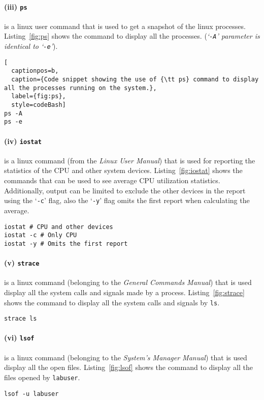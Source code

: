\documentclass[final,5p,times,authoryear]{elsarticle}
\begin{document}
% 
% 
\paragraph{(iii) {\tt ps}}is a linux user command that is used to get a snapshot of the linux processes. Listing~\ref{fig:ps} shows the command to display all the processes. ({\it `{\tt -A}' parameter is identical to `{\tt -e}'}).
\begin{lstlisting}[
  captionpos=b, 
  caption={Code snippet showing the use of {\tt ps} command to display all the processes running on the system.},
  label={fig:ps},
  style=codeBash]
ps -A
ps -e
\end{lstlisting}

% 
% 
\paragraph{(iv) {\tt iostat}}
is a linux command (from the {\it Linux User Manual}) that is used for reporting the statistics of the CPU and other system devices. Listing~\ref{fig:iostat} shows the commands that can be used to see average CPU utilization statistics. Additionally, output can be limited to exclude the other devices in the report using the `{\tt -c}' flag, also the `{\tt -y}' flag omits the first report when calculating the average.
\begin{lstlisting}[captionpos=b, caption={Code snippet showing the use of {\tt iostat} command.},label={fig:iostat},style=codeBash]
iostat # CPU and other devices
iostat -c # Only CPU
iostat -y # Omits the first report
\end{lstlisting}

% 
% 
\paragraph{(v) {\tt strace}}
is a linux command (belonging to the {\it General Commands Manual}) that is used display all the system calls and signals made by a process. Listing~\ref{fig:strace} shows the command to display all the system calls and  signals by {\tt ls}.
\begin{lstlisting}[captionpos=b, caption={Code snippet showing the use of {\tt strace} command to display the system calls made by {\tt ls}.},label={fig:strace},style=codeBash]
strace ls
\end{lstlisting}

% 
% 
\paragraph{(vi) {\tt lsof}}
is a linux command (belonging to the {\it System's Manager Manual}) that is used display all the open files. Listing~\ref{fig:lsof} shows the command to display all the files opened by {\tt labuser}.
\begin{lstlisting}[captionpos=b, caption={Code snippet showing the use of {\tt lsof} command to display list of opened files by {\tt labuser}.},label={fig:lsof},style=codeBash]
lsof -u labuser
\end{lstlisting}
\end{document}

